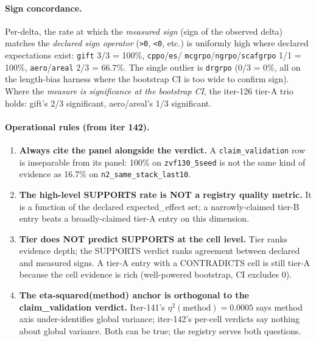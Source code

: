 \documentclass{article}
\begin{document}
\paragraph{Sign concordance.}
Per-delta, the rate at which the \emph{measured sign} (sign of the
observed delta) matches the \emph{declared sign operator}
(\texttt{>0}, \texttt{<0}, etc.) is uniformly high where declared
expectations exist: \texttt{gift} 3/3 = 100\%, \texttt{cppo}/\texttt{es}/
\texttt{mcgrpo}/\texttt{ngrpo}/\texttt{scafgrpo} 1/1 = 100\%,
\texttt{aero}/\texttt{areal} 2/3 = 66.7\%.  The single outlier is
\texttt{drgrpo} (0/3 = 0\%, all on the length-bias harness where the
bootstrap CI is too wide to confirm sign).  Where the \emph{measure is
significance at the bootstrap CI}, the iter-126 tier-A trio holds:
gift's 2/3 significant, aero/areal's 1/3 significant.

\paragraph{Operational rules (from iter 142).}
\begin{enumerate}
\item \textbf{Always cite the panel alongside the verdict.} A
\texttt{claim\_validation} row is inseparable from its panel: 100\% on
\texttt{zvf130\_5seed} is not the same kind of evidence as 16.7\% on
\texttt{n2\_same\_stack\_last10}.
\item \textbf{The high-level SUPPORTS rate is NOT a registry quality
metric.} It is a function of the declared expected\_effect set; a
narrowly-claimed tier-B entry beats a broadly-claimed tier-A entry on
this dimension.
\item \textbf{Tier does NOT predict SUPPORTS at the cell level.} Tier
ranks evidence depth; the SUPPORTS verdict ranks agreement between
declared and measured signs.  A tier-A entry with a CONTRADICTS cell is
still tier-A because the cell evidence is rich (well-powered bootstrap,
CI excludes 0).
\item \textbf{The eta-squared(method) anchor is orthogonal to the
claim\_validation verdict.} Iter-141's $\eta^2(\text{method}) = 0.0005$
says method axis under-identifies global variance; iter-142's per-cell
verdicts say nothing about global variance.  Both can be true; the
registry serves both questions.
\end{enumerate}
\end{document}
